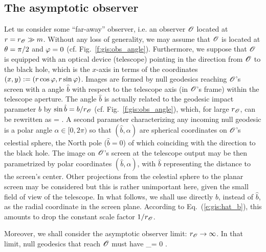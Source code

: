 \subsection{The asymptotic observer}

Let us consider some ``far-away'' observer, i.e. an observer $\mathscr{O}$ located at $r = r_{\mathscr{O}} \gg m$. Without
any loss of generality, we may assume that $\mathscr{O}$ is located at $\theta=\pi/2$ and $\varphi=0$
(cf. Fig.~\ref{f:gis:obs_angle}).
Furthermore, we suppose that $\mathscr{O}$ is
equipped with an optical device (telescope) pointing in the direction from $\mathscr{O}$ to the black hole, which
is the $x$-axis in terms of the coordinates $(x,y):=(r\cos\varphi,r\sin\varphi)$.
Images are formed by null geodesics reaching $\mathscr{O}$'s screen with a angle
$\hat{b}$ with respect to the telescope axis (in $\mathscr{O}$'s frame) within the
telescope aperture. The angle $\hat{b}$ is actually
related to the geodesic impact parameter $b$ by
$\sin\hat{b} = b / r_{\mathscr{O}}$ (cf. Fig.~\ref{f:gis:obs_angle}), which,
for large $r_{\mathscr{O}}$, can be rewritten as
\be \label{e:gis:hat_b}
     =  .
\ee
A second parameter characterizing any incoming null geodesic is a polar
angle $\alpha\in{[0, 2\pi)}$ so that $(\hat{b},\alpha)$ are spherical
coordinates on $\mathscr{O}$'s celestial sphere, the North pole ($\hat{b}=0$) of which
coinciding with the direction to the black hole. The image on $\mathscr{O}$'s screen
at the telescope output may be then parametrized by polar coordinates $(\hat{b}, \alpha)$, with $\hat{b}$ representing the distance to the screen's center.
Other projections from the celestial sphere to the planar screen may be considered
but this is rather unimportant here, given the small field of view of the telescope.
In what follows, we shall use directly $b$, instead of $\hat{b}$, as
the radial coordinate in the screen plane. According to Eq.~(\ref{e:gis:hat_b}),
this amounts to drop the constant
scale factor $1/r_{\mathscr{O}}$.

Moreover, we shall consider the asymptotic observer limit: $r_{\mathscr{O}}\to\infty$.
In that limit, null geodesics that reach $\mathscr{O}$ must have
\be \label{e:gis:ph_inf_0_mod_2pi}
\ph_\infty = 0  \pi .
\ee

